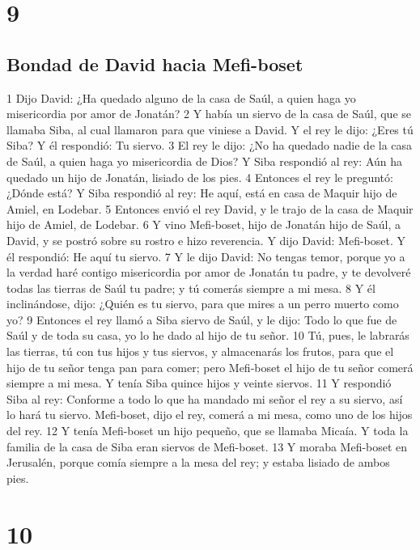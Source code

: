\chapter{9}

\section*{Bondad de David hacia Mefi-boset}


1 Dijo David: ¿Ha quedado alguno de la casa de Saúl, a quien haga yo misericordia por amor de Jonatán? 
2 Y había un siervo de la casa de Saúl, que se llamaba Siba, al cual llamaron para que viniese a David. Y el rey le dijo: ¿Eres tú Siba? Y él respondió: Tu siervo.
3 El rey le dijo: ¿No ha quedado nadie de la casa de Saúl, a quien haga yo misericordia de Dios? Y Siba respondió al rey: Aún ha quedado un hijo de Jonatán, lisiado de los pies.
4 Entonces el rey le preguntó: ¿Dónde está? Y Siba respondió al rey: He aquí, está en casa de Maquir hijo de Amiel, en Lodebar.
5 Entonces envió el rey David, y le trajo de la casa de Maquir hijo de Amiel, de Lodebar.
6 Y vino Mefi-boset, hijo de Jonatán hijo de Saúl, a David, y se postró sobre su rostro e hizo reverencia. Y dijo David: Mefi-boset. Y él respondió: He aquí tu siervo.
7 Y le dijo David: No tengas temor, porque yo a la verdad haré contigo misericordia por amor de Jonatán tu padre, y te devolveré todas las tierras de Saúl tu padre; y tú comerás siempre a mi mesa.
8 Y él inclinándose, dijo: ¿Quién es tu siervo, para que mires a un perro muerto como yo?
9 Entonces el rey llamó a Siba siervo de Saúl, y le dijo: Todo lo que fue de Saúl y de toda su casa, yo lo he dado al hijo de tu señor.
10 Tú, pues, le labrarás las tierras, tú con tus hijos y tus siervos, y almacenarás los frutos, para que el hijo de tu señor tenga pan para comer; pero Mefi-boset el hijo de tu señor comerá siempre a mi mesa. Y tenía Siba quince hijos y veinte siervos.
11 Y respondió Siba al rey: Conforme a todo lo que ha mandado mi señor el rey a su siervo, así lo hará tu siervo. Mefi-boset, dijo el rey, comerá a mi mesa, como uno de los hijos del rey.
12 Y tenía Mefi-boset un hijo pequeño, que se llamaba Micaía. Y toda la familia de la casa de Siba eran siervos de Mefi-boset.
13 Y moraba Mefi-boset en Jerusalén, porque comía siempre a la mesa del rey; y estaba lisiado de ambos pies.

\chapter{10}

